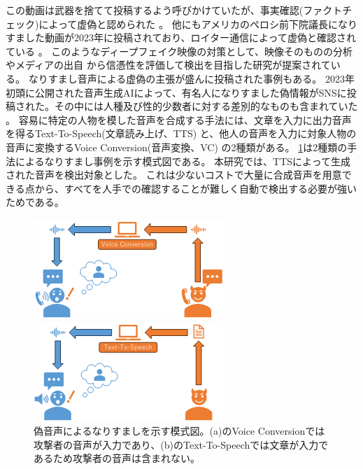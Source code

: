 この動画は武器を捨てて投稿するよう呼びかけていたが、事実確認(ファクトチェック)によって虚偽と認められた \cite{Staff_2020}。
他にもアメリカのペロシ前下院議長になりすました動画が2023年に投稿されており、ロイター通信によって虚偽と確認されている \cite{Check_2023}。
このようなディープフェイク映像の対策として、映像そのものの分析 \cite{8683164}やメディアの出自 \cite{8668407}から信憑性を評価して検出を目指した研究が提案されている。
なりすまし音声による虚偽の主張が盛んに投稿された事例もある。
2023年初頭に公開された音声生成AIによって、有名人になりすました偽情報がSNSに投稿された。その中には人種及び性的少数者に対する差別的なものも含まれていた \cite{cox_2023}。
容易に特定の人物を模した音声を合成する手法には、文章を入力に出力音声を得るText-To-Speech(文章読み上げ、TTS) \cite{klatt1987review}と、他人の音声を入力に対象人物の音声に変換するVoice Conversion(音声変換、VC) \cite{661472}の2種類がある。
\cref{fig:vctts}は2種類の手法によるなりすまし事例を示す模式図である。
本研究では、TTSによって生成された音声を検出対象とした。
これは少ないコストで大量に合成音声を用意できる点から、すべてを人手での確認することが難しく自動で検出する必要が強いためである。

\begin{figure}[h]
\centering
  \begin{minipage}[b]{0.9\linewidth}
    \centering
    \includegraphics[keepaspectratio, width=0.8\linewidth]{figures/vc.png}
  \end{minipage}
  \begin{minipage}[b]{0.9\linewidth}
    \centering
    \includegraphics[keepaspectratio, width=0.8\linewidth]{figures/tts.png}
  \end{minipage}
  \caption{偽音声によるなりすましを示す模式図。(a)のVoice Conversionでは攻撃者の音声が入力であり、(b)のText-To-Speechでは文章が入力であるため攻撃者の音声は含まれない。}
  \label{fig:vctts}
\end{figure}

